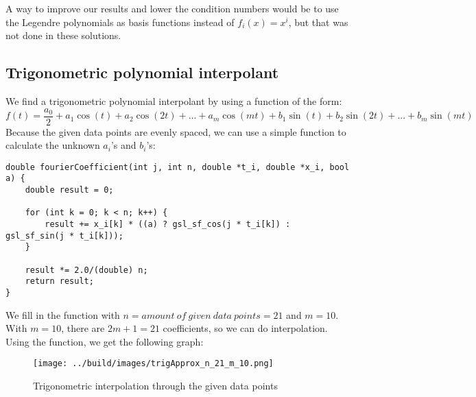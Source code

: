 \documentclass[11pt, a4paper, titlepage, openright]{article}
\begin{document}
A way to improve our results and lower the condition numbers would be to use the Legendre polynomials as basis functions instead
of \( f_i(x) = x^i \), but that was not done in these solutions.


\subsection{Trigonometric polynomial interpolant}
We find a trigonometric polynomial interpolant by using a function of the form:
    \[ f(t) = \frac{a_0}{2} + a_1 \cos (t) + a_2 \cos(2t) + ... + a_m \cos(mt) + b_1 \sin (t) + b_2 \sin (2t) + ... + b_m \sin (mt) \]
Because the given data points are evenly spaced, we can use a simple function to calculate the unknown \( a_i \)'s and \(b_i \)'s:
\begin{lstlisting}
double fourierCoefficient(int j, int n, double *t_i, double *x_i, bool a) {
    double result = 0;

    for (int k = 0; k < n; k++) {
        result += x_i[k] * ((a) ? gsl_sf_cos(j * t_i[k]) : gsl_sf_sin(j * t_i[k]));
    }

    result *= 2.0/(double) n;
    return result;
}
\end{lstlisting}
We fill in the function with \(n = amount \ of \ given\  data \ points = 21\) and \(m = 10\). With \(m = 10\), there are \(2m+1 = 21\)
coefficients, so we can do interpolation.
Using the function, we get the following graph:
    \begin{figure}[H]
        \centering
        \texttt{[image: ../build/images/trigApprox\_n\_21\_m\_10.png]}
        \caption{Trigonometric interpolation through the given data points}
        \label{fig:spline1}
    \end{figure}
\end{document}
